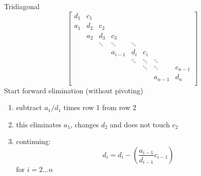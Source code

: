 \documentclass[10pt]{beamer}
\begin{document}
\begin{frame}{Tridiagonal}
\begin{equation*}
\begin{bmatrix}
d_1 & c_1 &       &         &       &       &          &    \\
a_1 & d_2 & c_2   &         &       &       &          &    \\
& a_2 & d_3   & c_3     &       &       &          &    \\
&     & \ddots & \ddots   & \ddots &       &          &    \\
&     &       & a_{i-1} & d_i   & c_{i} &          &    \\
&     &       &         & \ddots & \ddots & \ddots    &    \\
&     &       &         &       & \ddots & \ddots    & c_{n-1}   \\
&     &       &         &       &       & a_{n-1}  & d_n   \\
\end{bmatrix}
\end{equation*}
Start forward elimination (without pivoting)
\begin{enumerate}
  \item subtract $a_1/d_1$ times row 1 from row 2
  \item this eliminates $a_1$, changes $d_2$ and does not touch $c_2$
  \item continuing:
\begin{equation*}
  d_{i} = d_{i} - \left(\frac{a_{i-1}}{d_{i-1}} c_{i-1}\right)
\end{equation*}
for $i=2\dots n$
\end{enumerate}
\end{frame}
\end{document}
